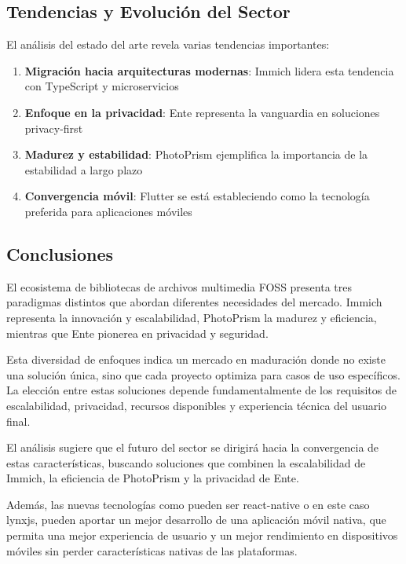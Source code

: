\subsection{Tendencias y Evolución del Sector}

El análisis del estado del arte revela varias tendencias importantes:

\begin{enumerate}
    \item \textbf{Migración hacia arquitecturas modernas}: Immich lidera esta tendencia con TypeScript y microservicios
    \item \textbf{Enfoque en la privacidad}: Ente representa la vanguardia en soluciones privacy-first
    \item \textbf{Madurez y estabilidad}: PhotoPrism ejemplifica la importancia de la estabilidad a largo plazo
    \item \textbf{Convergencia móvil}: Flutter se está estableciendo como la tecnología preferida para aplicaciones móviles
\end{enumerate}

\subsection{Conclusiones}

El ecosistema de bibliotecas de archivos multimedia FOSS presenta tres paradigmas distintos que abordan diferentes necesidades del mercado. Immich representa la innovación y escalabilidad, PhotoPrism la madurez y eficiencia, mientras que Ente pionerea en privacidad y seguridad.

Esta diversidad de enfoques indica un mercado en maduración donde no existe una solución única, sino que cada proyecto optimiza para casos de uso específicos. La elección entre estas soluciones depende fundamentalmente de los requisitos de escalabilidad, privacidad, recursos disponibles y experiencia técnica del usuario final.

El análisis sugiere que el futuro del sector se dirigirá hacia la convergencia de estas características, buscando soluciones que combinen la escalabilidad de Immich, la eficiencia de PhotoPrism y la privacidad de Ente.

Además, las nuevas tecnologías como pueden ser \gls{react-native} o en este caso \gls{lynxjs}, pueden aportar un mejor desarrollo de una aplicación móvil nativa, que permita una mejor experiencia de usuario y un mejor rendimiento en dispositivos móviles sin perder características nativas de las plataformas.

